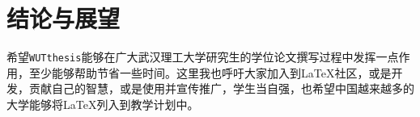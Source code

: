 \chapter{结论与展望}


\par 希望\texttt{WUTthesis}能够在广大武汉理工大学研究生的学位论文撰写过程中发挥一点作用，至少能够帮助节省一些时间。这里我也呼吁大家加入到{\LaTeX}社区，或是开发，贡献自己的智慧，或是使用并宣传推广，学生当自强，也希望中国越来越多的大学能够将{\LaTeX}列入到教学计划中。





